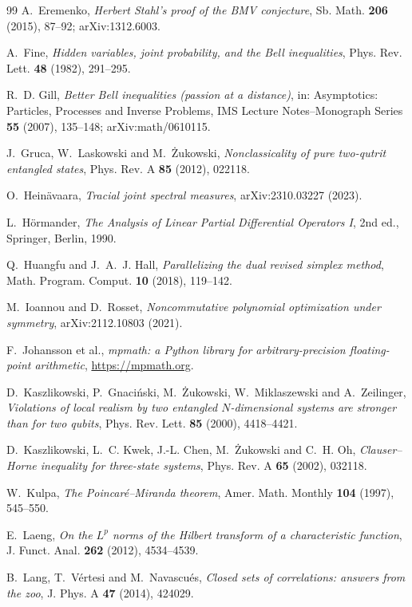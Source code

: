 \documentclass[11pt]{amsart}
\theoremstyle{definition}
\theoremstyle{remark}
\numberwithin{equation}{section}
\begin{document}
\begin{thebibliography}{99}
A.~Eremenko, \emph{Herbert Stahl's proof of the BMV conjecture}, Sb. Math. \textbf{206} (2015), 87--92; arXiv:1312.6003.

A.~Fine, \emph{Hidden variables, joint probability, and the Bell inequalities}, Phys. Rev. Lett. \textbf{48} (1982),
291--295.

R.~D. Gill, \emph{Better Bell inequalities (passion at a distance)}, in: Asymptotics: Particles, Processes and Inverse
Problems, IMS Lecture Notes--Monograph Series \textbf{55} (2007), 135--148; arXiv:math/0610115.

J.~Gruca, W.~Laskowski and M.~\.Zukowski, \emph{Nonclassicality of pure two-qutrit entangled states}, Phys. Rev. A
\textbf{85} (2012), 022118.

O.~Hein\"avaara, \emph{Tracial joint spectral measures}, arXiv:2310.03227 (2023).

L.~H\"ormander, \emph{The Analysis of Linear Partial Differential Operators I}, 2nd ed., Springer, Berlin, 1990.

Q.~Huangfu and J.~A.~J. Hall, \emph{Parallelizing the dual revised simplex method}, Math. Program. Comput. \textbf{10}
(2018), 119--142.

M.~Ioannou and D.~Rosset, \emph{Noncommutative polynomial optimization under symmetry}, arXiv:2112.10803 (2021).

F.~Johansson et al., \emph{mpmath: a Python library for arbitrary-precision floating-point arithmetic},
\url{https://mpmath.org}.

D.~Kaszlikowski, P.~Gnaci\'nski, M.~\.Zukowski, W.~Miklaszewski and A.~Zeilinger, \emph{Violations of local realism by two
entangled $N$-dimensional systems are stronger than for two qubits}, Phys. Rev. Lett. \textbf{85} (2000), 4418--4421.

D.~Kaszlikowski, L.~C. Kwek, J.-L. Chen, M.~\.Zukowski and C.~H. Oh, \emph{Clauser--Horne inequality for three-state
systems}, Phys. Rev. A \textbf{65} (2002), 032118.

W.~Kulpa, \emph{The Poincar\'e--Miranda theorem}, Amer. Math. Monthly \textbf{104} (1997), 545--550.

E.~Laeng, \emph{On the $L^p$ norms of the Hilbert transform of a characteristic function}, J. Funct. Anal. \textbf{262}
(2012), 4534--4539.

B.~Lang, T.~V\'ertesi and M.~Navascu\'es, \emph{Closed sets of correlations: answers from the zoo}, J. Phys. A \textbf{47}
(2014), 424029.


\end{thebibliography}
\end{document}
